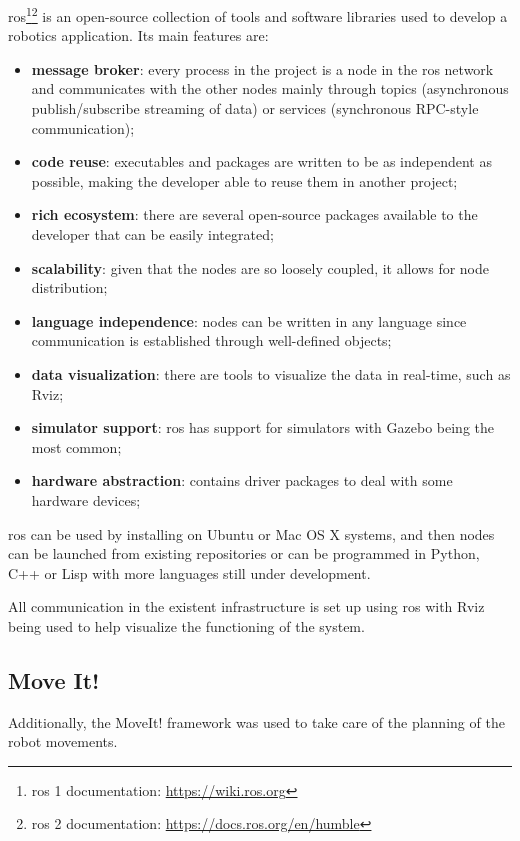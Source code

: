 \acs{ros}\cite{ROS2}\footnote{\acs{ros} 1 documentation: \url{https://wiki.ros.org}}\footnote{\acs{ros} 2 documentation: \url{https://docs.ros.org/en/humble}} is an open-source collection of tools and software libraries used to develop a robotics application. Its main features are:

\begin{itemize}
    \item \textbf{message broker}: every process in the project is a node in the \acs{ros} network and communicates with the other nodes mainly through topics (asynchronous publish/subscribe streaming of data) or services (synchronous RPC-style communication);
    \item \textbf{code reuse}: executables and packages are written to be as independent as possible, making the developer able to reuse them in another project;
    \item \textbf{rich ecosystem}: there are several open-source packages available to the developer that can be easily integrated;
    \item \textbf{scalability}: given that the nodes are so loosely coupled, it allows for node distribution;
    \item \textbf{language independence}: nodes can be written in any language since communication is established through well-defined objects;
    \item \textbf{data visualization}: there are tools to visualize the data in real-time, such as Rviz;
    \item \textbf{simulator support}: \acs{ros} has support for simulators with Gazebo being the most common;
    \item \textbf{hardware abstraction}: contains driver packages to deal with some hardware devices;
\end{itemize}

\acs{ros} can be used by installing on Ubuntu or Mac OS X systems, and then nodes can be launched from existing repositories or can be programmed in Python, C++ or Lisp with more languages still under development.

All communication in the existent infrastructure is set up using \acs{ros} with Rviz being used to help visualize the functioning of the system.

\subsection{Move It!}

Additionally, the MoveIt! framework was used to take care of the planning of the robot movements.


